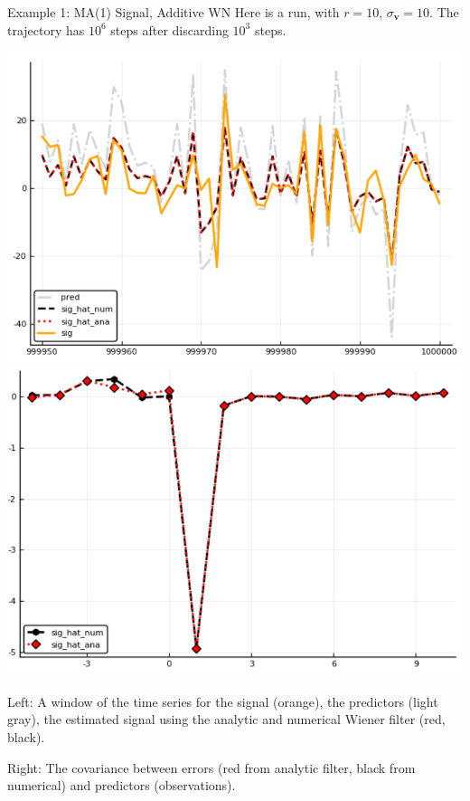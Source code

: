 \documentclass{beamer}  %
\begin{document}

\begin{frame}{Example 1: MA(1) Signal, Additive WN}
	Here is a run, with $r=10$, $\sigma_{\textbf{v}} = 10$. The trajectory has $10^6$ steps after discarding $10^3$ steps. 
	
	\includegraphics[scale=.33]{fig/figMA1_ts.png}
	\includegraphics[scale=.33]{fig/figMA1_cov.png}
	
	Left: A window of the time series for the signal (orange), the predictors (light gray), the estimated signal using the analytic and numerical Wiener filter (red, black). 
	
	Right: The covariance between errors (red from analytic filter, black from numerical) and predictors (observations). \\
\end{frame}
\end{document}
